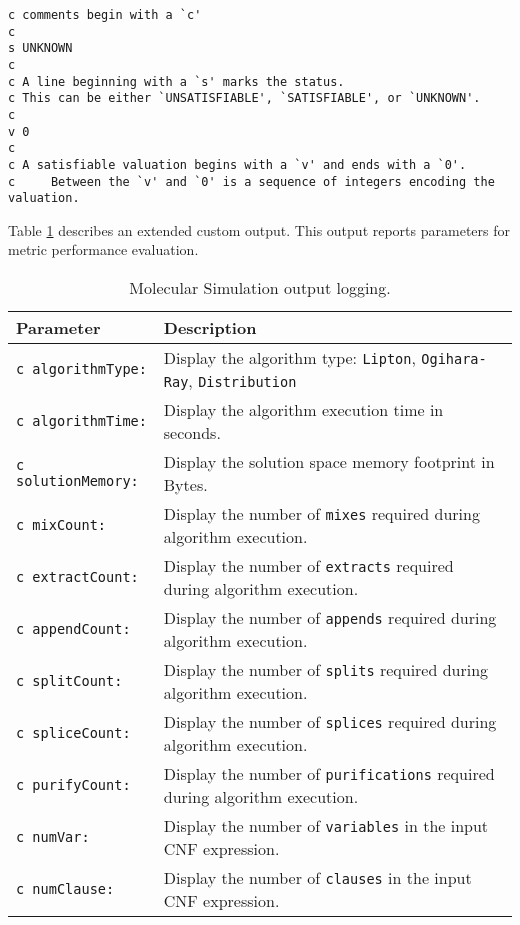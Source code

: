 \begin{verbatim}
c comments begin with a `c'
c
s UNKNOWN
c
c A line beginning with a `s' marks the status.
c This can be either `UNSATISFIABLE', `SATISFIABLE', or `UNKNOWN'.
c
v 0
c
c A satisfiable valuation begins with a `v' and ends with a `0'.
c     Between the `v' and `0' is a sequence of integers encoding the valuation.
\end{verbatim}

Table \ref{outputTableDefiniton} describes an extended custom output.  This output reports parameters for metric performance evaluation.
\begin{table}[htdp]
\caption{Molecular Simulation output logging.}
\begin{center}
\begin{tabular}{| l | l |}
\hline
\textbf{Parameter} & \textbf{Description} \\ \hline	
\texttt{c algorithmType:}&	Display the algorithm type: \texttt{Lipton}, \texttt{Ogihara-Ray}, \texttt{Distribution}\\ 
\texttt{c algorithmTime:}&	Display the algorithm execution time in seconds.\\ 
\texttt{c solutionMemory:}& Display the solution space memory footprint in Bytes.	\\ 
\texttt{c mixCount:}	&	Display the number of \texttt{mixes} required during algorithm execution.\\ 
\texttt{c extractCount:}&	Display the number of \texttt{extracts} required during algorithm execution.\\ 
\texttt{c appendCount:}&	Display the number of \texttt{appends} required during algorithm execution.\\ 
\texttt{c splitCount:}	&	Display the number of \texttt{splits} required during algorithm execution.\\ 
\texttt{c spliceCount:}&	Display the number of \texttt{splices} required during algorithm execution.\\ 
\texttt{c purifyCount:}&	Display the number of \texttt{purifications} required during algorithm execution.\\ 
\texttt{c numVar:}	&	Display the number of \texttt{variables} in the input CNF expression.\\ 
\texttt{c numClause:}	&	Display the number of \texttt{clauses} in the input CNF expression.\\ \hline

\end{tabular}
\end{center}
\label{outputTableDefiniton}
\end{table}%
		

